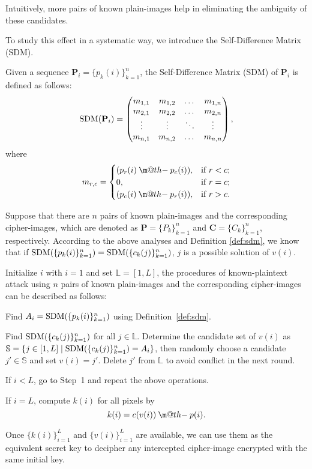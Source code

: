 \documentclass[smallextended, final]{svjour3}          \smartqed
\makeatletter
\newcommand{\dotminus}{\mathbin{\text{\@dotminus}}}
\newcommand{\@dotminus}{\ooalign{\hidewidth\raise1ex\hbox{.}\hidewidth\cr$\m@th-$\cr}}
\newcommand\SDM{{\rm SDM}}
\makeatother
\begin{document}
Intuitively, more pairs of known plain-images help in eliminating {the} ambiguity of these candidates.
{To study this effect in a systematic way, we introduce the Self-Difference Matrix (SDM).
\begin{definition}
\label{def:sdm}
Given a sequence $\mathbf{P}_i = \{p_{k}(i)\}_{k=1}^{n}$,
the Self-Difference Matrix (SDM) of $\mathbf{P}_i$ is defined as follows:
\begin{equation}
\SDM(\mathbf{P}_i) =
\begin{pmatrix}
m_{1,1} &m_{1,2} & \dots  & m_{1,n} \\
m_{2,1} &m_{2,2} & \dots  & m_{2,n} \\
\vdots  &\vdots  & \ddots & \vdots \\
m_{n,1} &m_{n,2} & \dots  & m_{n, n} \\
\end{pmatrix},
\end{equation}
where
\begin{equation}
\nonumber
m_{r,c} =
\begin{cases}
(p_{r}(i) \dotminus p_{c}(i)), &\mbox{if } r < c; \\
0, &\mbox{if } r = c; \\
(p_{c}(i) \dotminus p_{r}(i)), &\mbox{if } r > c.
\end{cases}
\end{equation}
\end{definition}}

Suppose that there are $n$ pairs of known plain-images and the corresponding cipher-images,
which are denoted as $\mathbf{P} = \{P_k\}_{k=1}^{n}$ and $\mathbf{C} = \{C_k\}_{k=1}^{n}$,
respectively. According to the above analyses and Definition \ref{def:sdm},
we know that if $\SDM(\{p_{k}(i)\}_{k=1}^{n}) = \SDM(\{c_{k}(j)\}_{k=1}^{n})$,
$j$ is a possible solution of $v(i)$.

Initialize $i$ with $i=1$ and set $\mathbb{L} = [1, L]$, the procedures
of known-plaintext attack using $n$ pairs of known plain-images and the corresponding cipher-images can be described as follows:
\begin{description}
\item[Step 1:] {Find $A_i =\SDM(\{p_{k}(i)\}_{k=1}^{n})$ using Definition~\ref{def:sdm}}.
\item[Step 2:] Find $\SDM(\{c_{k}(j)\}_{k=1}^{n})$ for all $j \in \mathbb{L}$. Determine the candidate set of $v(i)$ as
$\mathbb{S}=\{ j \in [1, L] \mid  \SDM(\{c_{k}(j)\}_{k=1}^{n}) =  A_i\}$, then randomly choose a candidate $j' \in \mathbb{S}$  and set $v(i)=j'$. Delete $j'$ from $\mathbb{L}$
to avoid conflict in the next round.
\item[Step 3:] If $i<L$, go to Step~1 and repeat the above operations.
\item[Step 4:] If $i=L$, compute $k(i)$ for all pixels by
\begin{equation}
\nonumber
k(i) = c(v(i)) \dotminus p(i).
\end{equation}
\end{description}
Once $\{k(i)\}_{i=1}^{L}$ and $\{v(i)\}_{i=1}^{L}$ are available, we can use them as the equivalent secret key to decipher any intercepted cipher-image encrypted with the same initial key.
\end{document}
